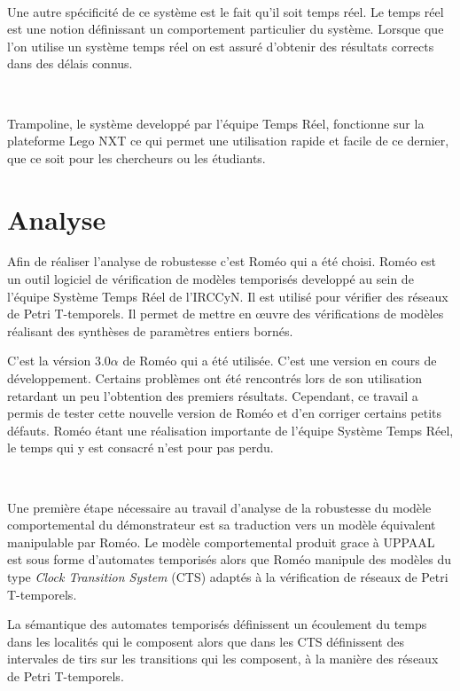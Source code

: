       ~
    
      Une autre spécificité de ce système est le fait qu'il soit temps réel. Le
      temps réel est une notion définissant un comportement particulier du
      système. Lorsque que l'on utilise un système temps réel on est assuré
      d'obtenir des résultats corrects dans des délais connus.

      ~
    
      Trampoline, le système developpé par l'équipe Temps Réel, fonctionne sur
      la plateforme Lego NXT ce qui permet une utilisation rapide et facile de
      ce dernier, que ce soit pour les chercheurs ou les étudiants.
      
  \section{Analyse}
    
    Afin de réaliser l'analyse de robustesse c'est Roméo \cite{gardey05}
    qui a été choisi. Roméo est un outil logiciel de vérification de modèles temporisés
    developpé au sein de l'équipe Système Temps Réel de l'IRCCyN. Il est utilisé pour
    vérifier des réseaux de Petri T-temporels. Il permet de mettre en \oe uvre
    des vérifications de modèles réalisant des synthèses de paramètres entiers
    bornés.

    C'est la vérsion 3.0$\alpha$ de Roméo qui a été utilisée. C'est une version
    en cours de développement. Certains problèmes ont été rencontrés lors
    de son utilisation retardant un peu l'obtention des premiers résultats.
    Cependant, ce travail a permis de tester cette nouvelle version de Roméo
    et d'en corriger certains petits défauts. Roméo étant une
    réalisation importante de l'équipe Système Temps Réel, le temps qui y est
    consacré n'est pour pas perdu.
    
    ~
    
    Une première étape nécessaire au travail d'analyse de la robustesse du
    modèle comportemental du démonstrateur est sa traduction vers un modèle
    équivalent manipulable par Roméo. Le modèle comportemental produit grace
    à UPPAAL est sous forme d'automates temporisés alors que Roméo manipule
    des modèles du type {\it Clock Transition System} \cite{lime12} (CTS) 
    adaptés à la vérification de réseaux de Petri T-temporels.
    
    La sémantique des automates temporisés définissent un écoulement du temps dans
    les localités qui le composent alors que dans les CTS définissent des intervales 
    de tirs sur les transitions qui les composent, à la manière des réseaux de
    Petri T-temporels.
    
